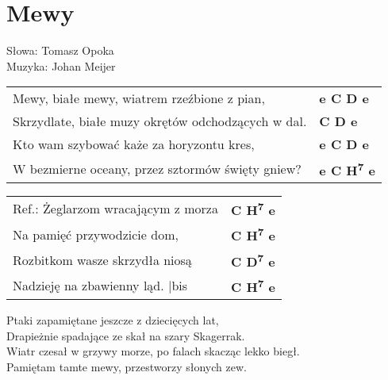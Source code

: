 \section{Mewy}

Słowa: Tomasz Opoka\\
Muzyka: Johan Meijer

\vspace{2em}
\begin{tabular}{@{}p{9cm}@{}l@{}}
Mewy, białe mewy, wiatrem rzeźbione z pian, & \bfseries e C D e \\
Skrzydlate, białe muzy okrętów odchodzących w dal. & \bfseries C D e \\
Kto wam szybować każe za horyzontu kres, & \bfseries e C D e \\
W bezmierne oceany, przez sztormów święty gniew? & \bfseries e C H\textsuperscript{7} e \\
\end{tabular}

\vspace{1em}
\begin{tabular}{@{}p{9cm}@{}l@{}}
Ref.: Żeglarzom wracającym z morza & \bfseries C H\textsuperscript{7} e \\
Na pamięć przywodzicie dom, & \bfseries C H\textsuperscript{7} e \\
Rozbitkom wasze skrzydła niosą & \bfseries C D\textsuperscript{7} e \\
Nadzieję na zbawienny ląd.      |bis & \bfseries C H\textsuperscript{7} e \\
\end{tabular}

\vspace{1em}
Ptaki zapamiętane jeszcze z dziecięcych lat, \\
Drapieżnie spadające ze skał na szary Skagerrak. \\
Wiatr czesał w grzywy morze, po falach skacząc lekko biegł. \\
Pamiętam tamte mewy, przestworzy słonych zew. \\